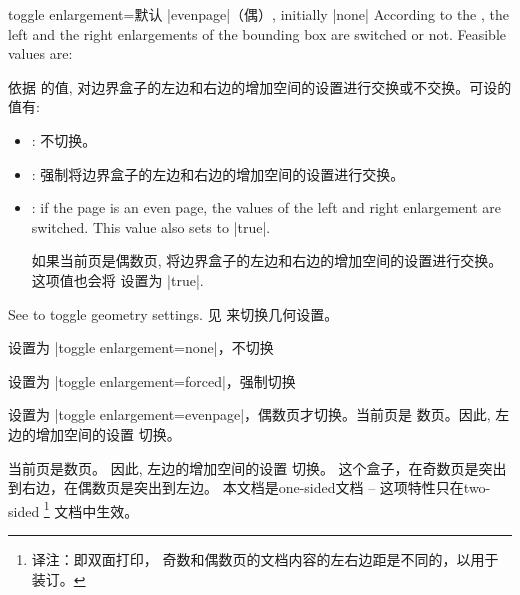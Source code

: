 \begin{docTcbKey}[][doc updated=2015-11-13]{toggle enlargement}{=}{默认 |evenpage|（偶）, initially |none|}
According to the , the left and the right enlargements of
the bounding box are switched or not. Feasible values are:

依据  的值, 对边界盒子的左边和右边的增加空间的设置进行交换或不交换。可设的值有:
\begin{itemize}
\item{}: %
不切换。
\item{}: %
强制将边界盒子的左边和右边的增加空间的设置进行交换。
\item{}: 
if the page is an even page, the values of the left and    right enlargement are switched. This value also sets     to |true|.

如果当前页是偶数页, 将边界盒子的左边和右边的增加空间的设置进行交换。这项值也会将   设置为 |true|.
\end{itemize}
\begin{marker}
See  to toggle geometry settings.
见  来切换几何设置。
\end{marker}

\begin{dispExample}

\begin{tcolorbox}[toggle enlargement=none
,enhanced,show bounding box]
设置为 |toggle enlargement=none|，不切换
\end{tcolorbox}
\begin{tcolorbox}[toggle enlargement=forced]
设置为 |toggle enlargement=forced|，强制切换
\end{tcolorbox}
\begin{tcolorbox}[toggle enlargement=evenpage]
设置为 |toggle enlargement=evenpage|，偶数页才切换。当前页是  数页。因此, 左边的增加空间的设置 切换。
\end{tcolorbox}
\end{dispExample}

\begin{dispListing}
\begin{tcolorbox}[colframe=red!60!black,colback=red!15!white,
fonttitle=\bfseries,title=Floating box from \texttt{toggle enlargement},
width=\textwidth
,grow to right by=2cm%
,toggle enlargement%
,float=t]
当前页是数页。%
因此, 左边的增加空间的设置 切换。%
这个盒子，在奇数页是突出到右边，在偶数页是突出到左边。%
本文档是one-sided文档 -- 这项特性只在two-sided%
\footnote{译注：即双面打印，%
奇数和偶数页的文档内容的左右边距是不同的，以用于装订。}%
文档中生效。
\end{tcolorbox}
\end{dispListing}
\tcbusetemp
\end{docTcbKey}
